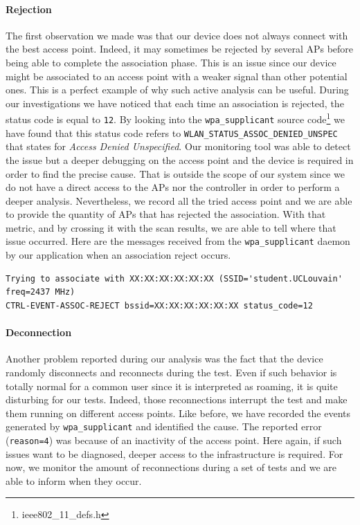 \paragraph*{Rejection} The first observation we made was that our device does not always connect with the best access point. Indeed, it may sometimes be rejected by several APs before being able to complete the association phase. This is an issue since our device might be associated to an access point with a weaker signal than other potential ones. This is a perfect example of why such active analysis can be useful. During our investigations we have noticed that each time an association is rejected, the status code is equal to \texttt{12}. By looking into the \texttt{wpa\_supplicant} source code\footnote{ieee802\_11\_defs.h} we have found that this status code refers to \texttt{WLAN\_STATUS\_ASSOC\_DENIED\_UNSPEC} that states for \emph{Access Denied Unspecified}. Our monitoring tool was able to detect the issue but a deeper debugging on the access point and the device is required in order to find the precise cause. That is outside the scope of our system since we do not have a direct access to the APs nor the controller in order to perform a deeper analysis. Nevertheless, we record all the tried access point and we are able to provide the quantity of APs that has rejected the association. With that metric, and by crossing it with the scan results, we are able to tell where that issue occurred. Here are the messages received from the \texttt{wpa\_supplicant} daemon by our application when an association reject occurs.\\

\begin{lstlisting}[frame=single,breaklines=true,caption={Exemple of rejection}]
Trying to associate with XX:XX:XX:XX:XX:XX (SSID='student.UCLouvain' freq=2437 MHz)
CTRL-EVENT-ASSOC-REJECT bssid=XX:XX:XX:XX:XX:XX status_code=12
\end{lstlisting}

\paragraph*{Deconnection} Another problem reported during our analysis was the fact that the device randomly disconnects and reconnects during the test. Even if such behavior is totally normal for a common user since it is interpreted as roaming, it is quite disturbing for our tests. Indeed, those reconnections interrupt the test and make them running on different access points. Like before, we have recorded the events generated by \texttt{wpa\_supplicant} and identified the cause. The reported error (\texttt{reason=4}) was because of an inactivity of the access point. Here again, if such issues want to be diagnosed, deeper access to the infrastructure is required. For now, we monitor the amount of reconnections during a set of tests and we are able to inform when they occur.\\

